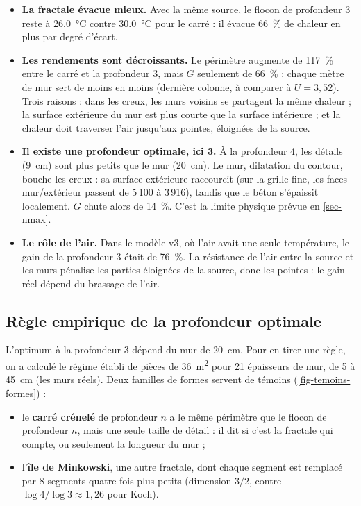 \documentclass[11pt,a4paper]{article}
\theoremstyle{definition}
\theoremstyle{remark}
\begin{document}
\begin{itemize}
  \item \textbf{La fractale évacue mieux.} Avec la même source, le flocon de profondeur
  3 reste à \qty{26,0}{\degreeCelsius} contre \qty{30,0}{\degreeCelsius} pour le
  carré : il évacue \qty{66}{\percent} de chaleur en plus par degré d'écart.
  \item \textbf{Les rendements sont décroissants.} Le périmètre augmente de
  \qty{117}{\percent} entre le carré et la profondeur 3, mais $G$ seulement de
  \qty{66}{\percent} : chaque mètre de mur sert de moins en moins (dernière colonne,
  à comparer à $U = 3,52$). Trois raisons : dans les creux, les murs voisins se
  partagent la même chaleur ; la surface extérieure du mur est plus courte que la
  surface intérieure ; et la chaleur doit traverser l'air jusqu'aux pointes,
  éloignées de la source.
  \item \textbf{Il existe une profondeur optimale, ici 3.} À la profondeur 4, les
  détails (\qty{9}{\centi\metre}) sont plus petits que le mur (\qty{20}{\centi\metre}).
  Le mur, dilatation du contour, bouche les creux : sa surface extérieure raccourcit
  (sur la grille fine, les faces mur/extérieur passent de 5\,100 à 3\,916), tandis que
  le béton s'épaissit localement. $G$ chute alors de \qty{14}{\percent}. C'est la
  limite physique prévue en \cref{sec-nmax}.
  \item \textbf{Le rôle de l'air.} Dans le modèle v3, où l'air avait une seule
  température, le gain de la profondeur 3 était de \qty{76}{\percent}. La résistance
  de l'air entre la source et les murs pénalise les parties éloignées de la source,
  donc les pointes : le gain réel dépend du brassage de l'air.
\end{itemize}

\subsection{Règle empirique de la profondeur optimale}\label{sec-loi}

L'optimum à la profondeur 3 dépend du mur de \qty{20}{\centi\metre}. Pour en tirer une
règle, on a calculé le régime établi de pièces de \qty{36}{\square\metre} pour 21
épaisseurs de mur, de 5 à \qty{45}{\centi\metre} (les murs réels). Deux familles de formes servent de témoins
(\cref{fig-temoins-formes}) :
\begin{itemize}
  \item le \textbf{carré crénelé} de profondeur $n$ a le même périmètre que le flocon
  de profondeur $n$, mais une seule taille de détail : il dit si c'est la fractale qui
  compte, ou seulement la longueur du mur ;
  \item l'\textbf{île de Minkowski}, une autre fractale, dont chaque segment est
  remplacé par 8 segments quatre fois plus petits (dimension $3/2$, contre
  $\log 4/\log 3\approx 1,26$ pour Koch).
\end{itemize}
\end{document}
